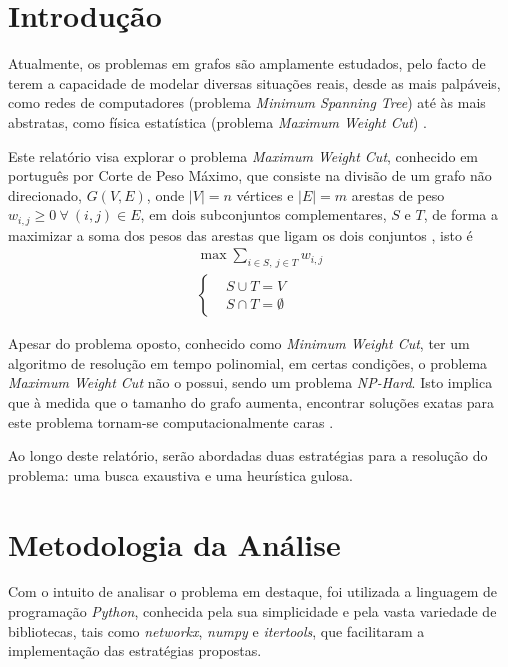 \documentclass[mirror]{revdetua}
\begin{document}
\section{Introdução}

Atualmente, os problemas em grafos são amplamente estudados, pelo facto de terem a capacidade de modelar diversas situações reais, desde as mais palpáveis, como redes de computadores (problema \textit{Minimum Spanning Tree}) até às mais abstratas, como física estatística (problema \textit{Maximum Weight Cut}) \cite{WANG10}.

Este relatório visa explorar o problema \textit{Maximum Weight Cut}, conhecido em português por Corte de Peso Máximo, que consiste na divisão de um grafo não direcionado, $G(V, E)$, onde $|V| = n$ vértices e $|E| = m$ arestas de peso $w_{i,j} \geq 0\ \forall\ (i,j) \in E$, em dois subconjuntos complementares, $S$ e $T$, de forma a maximizar a soma dos pesos das arestas que ligam os dois conjuntos \cite{SC03}, isto é
\begin{equation*}
    \begin{split}
        \max \sum_{i \in S,\ j \in T} w_{i,j} \\ 
        \left\{\begin{split}
            &S \cup T = V \\
            &S \cap T = \emptyset
        \end{split}\right.
    \end{split}
\end{equation*}

Apesar do problema oposto, conhecido como \textit{Minimum Weight Cut}, ter um algoritmo de resolução em tempo polinomial, em certas condições, o problema \textit{Maximum Weight Cut} não o possui, sendo um problema \textit{NP-Hard}. Isto implica que à medida que o tamanho do grafo aumenta, encontrar soluções exatas para este problema tornam-se computacionalmente caras \cite{SS23}.

Ao longo deste relatório, serão abordadas duas estratégias para a resolução do problema: uma busca exaustiva e uma heurística gulosa.


\section{Metodologia da Análise}

Com o intuito de analisar o problema em destaque, foi utilizada a linguagem de programação \textit{Python}, conhecida pela sua simplicidade e pela vasta variedade de bibliotecas, tais como \textit{networkx}, \textit{numpy} e \textit{itertools}, que facilitaram a implementação das estratégias propostas.
\end{document}
